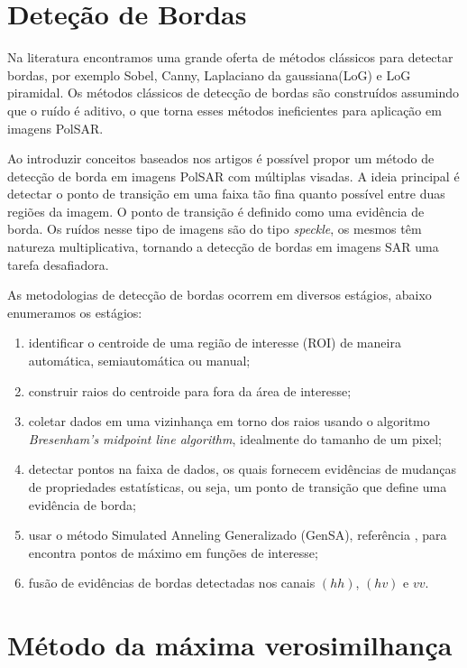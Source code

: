 \documentclass[conference]{IEEEtran}
\begin{document}
\section{Deteção de Bordas}\label{sec_04}

Na literatura encontramos uma grande oferta de métodos clássicos para detectar bordas, por exemplo Sobel, Canny, Laplaciano da gaussiana(LoG) e LoG piramidal. Os métodos clássicos de detecção de bordas são construídos assumindo que o ruído é aditivo, o que torna esses métodos ineficientes para aplicação em imagens PolSAR.

Ao introduzir conceitos baseados nos artigos \cite{nhfc, gmbf} é possível propor um método de detecção de borda em imagens PolSAR com múltiplas visadas. A ideia principal é detectar o ponto de transição em uma faixa tão fina quanto possível entre duas regiões da imagem. O ponto de transição é definido como uma evidência de borda. Os ruídos nesse tipo de imagens são do tipo \textit{speckle}, os mesmos têm natureza multiplicativa, tornando a detecção de bordas em imagens SAR uma tarefa desafiadora.

As metodologias de detecção de bordas ocorrem em diversos estágios, abaixo enumeramos os estágios:
\begin{enumerate}
	\item identificar o centroide de uma região de interesse (ROI) de maneira automática, semiautomática ou manual;
	\item construir raios do centroide para fora da área de interesse;
	\item coletar dados em uma vizinhança em torno dos raios usando o algoritmo {\it Bresenham's midpoint line algorithm}, idealmente do tamanho de um pixel;
	\item detectar pontos na faixa de dados, os quais fornecem evidências de mudanças de propriedades estatísticas, ou seja, um ponto de transição que define uma evidência de borda;
	\item usar o método Simulated Anneling Generalizado (GenSA), referência \cite{xgsh}, para encontra pontos de máximo em funções de interesse;
	\item fusão de evidências de bordas detectadas nos canais $(hh)$, $(hv)$ e $vv$.
\end{enumerate}

\section{Método da máxima verosimilhança}\label{sec_05}
\end{document}
